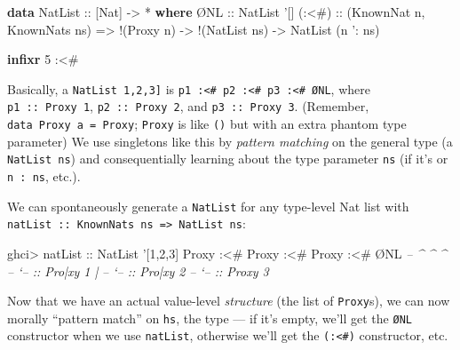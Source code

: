 \documentclass[]{article}
\newenvironment{Shaded}{}{}
\newcommand{\KeywordTok}[1]{\textcolor[rgb]{0.00,0.44,0.13}{\textbf{{#1}}}}
\newcommand{\DataTypeTok}[1]{\textcolor[rgb]{0.56,0.13,0.00}{{#1}}}
\newcommand{\DecValTok}[1]{\textcolor[rgb]{0.25,0.63,0.44}{{#1}}}
\newcommand{\CharTok}[1]{\textcolor[rgb]{0.25,0.44,0.63}{{#1}}}
\newcommand{\CommentTok}[1]{\textcolor[rgb]{0.38,0.63,0.69}{\textit{{#1}}}}
\newcommand{\OtherTok}[1]{\textcolor[rgb]{0.00,0.44,0.13}{{#1}}}
\newcommand{\FunctionTok}[1]{\textcolor[rgb]{0.02,0.16,0.49}{{#1}}}
\newcommand{\NormalTok}[1]{{#1}}
\begin{document}
\begin{Shaded}
\begin{Highlighting}[]
\KeywordTok{data} \DataTypeTok{NatList}\OtherTok{ ::} \NormalTok{[}\DataTypeTok{Nat}\NormalTok{] }\OtherTok{->} \FunctionTok{*} \KeywordTok{where}
    \NormalTok{Ø}\DataTypeTok{NL}\OtherTok{   ::} \DataTypeTok{NatList} \CharTok{'[]}
\OtherTok{    (:<#) ::} \NormalTok{(}\DataTypeTok{KnownNat} \NormalTok{n, }\DataTypeTok{KnownNats} \NormalTok{ns)}
          \OtherTok{=>} \FunctionTok{!}\NormalTok{(}\DataTypeTok{Proxy} \NormalTok{n) }\OtherTok{->} \FunctionTok{!}\NormalTok{(}\DataTypeTok{NatList} \NormalTok{ns) }\OtherTok{->} \DataTypeTok{NatList} \NormalTok{(n }\CharTok{': ns)}

\KeywordTok{infixr} \DecValTok{5} \FunctionTok{:<#}
\end{Highlighting}
\end{Shaded}

Basically, a \texttt{NatList\ \textquotesingle{}{[}1,2,3{]}} is
\texttt{p1\ :\textless{}\#\ p2\ :\textless{}\#\ p3\ :\textless{}\#\ ØNL},
where \texttt{p1\ ::\ Proxy\ 1}, \texttt{p2\ ::\ Proxy\ 2}, and
\texttt{p3\ ::\ Proxy\ 3}. (Remember, \texttt{data\ Proxy\ a\ =\ Proxy};
\texttt{Proxy} is like \texttt{()} but with an extra phantom type
parameter) We use singletons like this by \emph{pattern matching} on the
general type (a \texttt{NatList\ ns}) and consequentially learning about
the type parameter \texttt{ns} (if it's
\texttt{\textquotesingle{}{[}{]}} or
\texttt{n\ \textquotesingle{}:\ ns}, etc.).

We can spontaneously generate a \texttt{NatList} for any type-level Nat
list with
\texttt{natList\ ::\ KnownNats\ ns\ =\textgreater{}\ NatList\ ns}:

\begin{Shaded}
\begin{Highlighting}[]
\NormalTok{ghci}\FunctionTok{>}\OtherTok{ natList ::} \DataTypeTok{NatList} \CharTok{'[1,2,3]}
\DataTypeTok{Proxy} \FunctionTok{:<#} \DataTypeTok{Proxy} \FunctionTok{:<#} \DataTypeTok{Proxy} \FunctionTok{:<#} \NormalTok{Ø}\DataTypeTok{NL}
\CommentTok{-- ^         ^         ^}
\CommentTok{-- `-- :: Pro|xy 1     |}
\CommentTok{--           `-- :: Pro|xy 2}
\CommentTok{--                     `-- :: Proxy 3}
\end{Highlighting}
\end{Shaded}

Now that we have an actual value-level \emph{structure} (the list of
\texttt{Proxy}s), we can now morally ``pattern match'' on \texttt{hs},
the type --- if it's empty, we'll get the \texttt{ØNL} constructor when
we use \texttt{natList}, otherwise we'll get the
\texttt{(:\textless{}\#)} constructor, etc.
\end{document}
